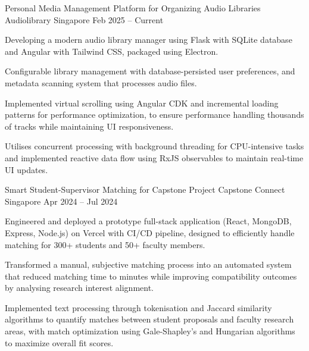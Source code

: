 

\begin{cventries}
    \cventry
    {Personal Media Management Platform for Organizing Audio Libraries} %
    {Audiolibrary} %
    {Singapore} %
    {Feb 2025 – Current} %
    {
        \begin{cvitems} %
            \item {Developing a modern audio library manager using Flask with SQLite database and Angular with Tailwind CSS, packaged using Electron.}
            \item {Configurable library management with database-persisted user preferences, and metadata scanning system that processes audio files.}
            \item {Implemented virtual scrolling using Angular CDK and incremental loading patterns for performance optimization, to ensure performance handling thousands of tracks while maintaining UI responsiveness.}
            \item {Utilises concurrent processing with background threading for CPU-intensive tasks and implemented reactive data flow using RxJS observables to maintain real-time UI updates.}
            \vspace{5mm}
        \end{cvitems}
    }

    \cventry
    {Smart Student-Supervisor Matching for Capstone Project} %
    {Capstone Connect} %
    {Singapore} %
    {Apr 2024 – Jul 2024} %
    {
        \begin{cvitems} %
            \item {Engineered and deployed a prototype full-stack application (React, MongoDB, Express, Node.js) on Vercel with CI/CD pipeline, designed to efficiently handle matching for 300+ students and 50+ faculty members.}
            \item {Transformed a manual, subjective matching process into an automated system that reduced matching time to minutes while improving compatibility outcomes by analysing research interest alignment.}
            \item {Implemented text processing through tokenisation and Jaccard similarity algorithms to quantify matches between student proposals and faculty research areas, with match optimization using Gale-Shapley's and Hungarian algorithms to maximize overall fit scores.}
            \vspace{5mm}
        \end{cvitems}
    }


\end{cventries}
